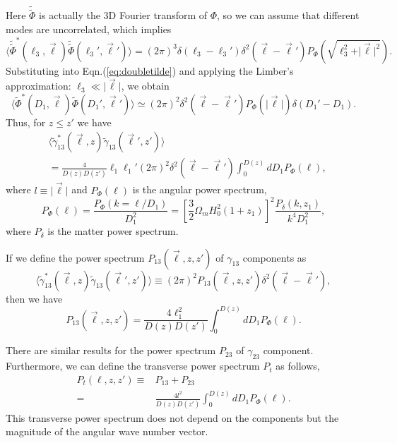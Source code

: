 Here $\tilde{\tilde{\Phi}}$ is actually the 3D Fourier transform of $\Phi$, so we can assume that different modes are uncorrelated, which implies
\begin{equation}
\langle\tilde{\tilde{\Phi}}^*(\ell_3,\vec{\ell})\tilde{\tilde{\Phi}}(\ell_3',\vec{\ell}')\rangle=(2\pi)^3\delta(\ell_3-\ell_3')\delta^2(\vec{\ell}-\vec{\ell}')P_{\Phi}(\sqrt{\ell_3^2+\vert\vec{\ell}\vert^2}).
\end{equation}
Substituting into Eqn.(\ref{eq:doubletilde}) and applying the Limber's approximation: $\ell_3\ll\vert\vec{\ell}\vert$, we obtain
\begin{equation}
\langle\tilde{\Phi}^*(D_1,\vec{\ell})\tilde{\Phi}(D_1',\vec{\ell}')\rangle\simeq(2\pi)^2\delta^2(\vec{\ell}-\vec{\ell}')P_{\Phi}(\vert\vec{\ell}\vert)\delta(D_1'-D_1).
\end{equation}
Thus, for $z\leq z'$ we have
\begin{align}
&\langle\tilde{\gamma}_{13}^*(\vec{\ell},z)\tilde{\gamma}_{13}(\vec{\ell}',z')\rangle\nonumber\\
&=\frac{4}{D(z)D(z')}\ell_1\ell_1'(2\pi)^2\delta^2(\vec{\ell}-\vec{\ell}')\int_0^{D(z)}dD_1P_{\Phi}(\ell),
\end{align}
where $l\equiv\vert\vec{\ell}\vert$ and $P_{\Phi}(\ell)$ is the angular power spectrum,
\begin{equation}
P_{\Phi}(\ell)=\frac{P_{\Phi}(k=\ell/D_1)}{D_1^2}=\left[\frac{3}{2}\Omega_mH_0^2(1+z_1)\right]^2\frac{P_{\delta}(k,z_1)}{k^4D_1^2},
\end{equation}
where $P_\delta$ is the matter power spectrum.

If we define the power spectrum $P_{13}(\vec{\ell},z,z')$ of $\gamma_{13}$ components as
\begin{equation}
\langle\tilde{\gamma}_{13}^*(\vec{\ell},z)\tilde{\gamma}_{13}(\vec{\ell}',z')\rangle\equiv(2\pi)^2P_{13}(\vec{\ell},z,z')\delta^2(\vec{\ell}-\vec{\ell}'),
\end{equation}
then we have
\begin{equation}
P_{13}(\vec{\ell},z,z')=\frac{4\ell_1^2}{D(z)D(z')}\int_0^{D(z)}dD_1P_{\Phi}(\ell).
\end{equation}

There are similar results for the power spectrum $P_{23}$ of $\gamma_{23}$ component. Furthermore, we can define the transverse power spectrum $P_t$ as follows,
\begin{align}
P_t(\ell,z,z')\equiv &P_{13}+P_{23}\nonumber\\
=&\frac{4l^2}{D(z)D(z')}\int_0^{D(z)}dD_1P_{\Phi}(\ell).
\end{align}
This transverse power spectrum does not depend on the components but the magnitude of the angular wave number vector.

